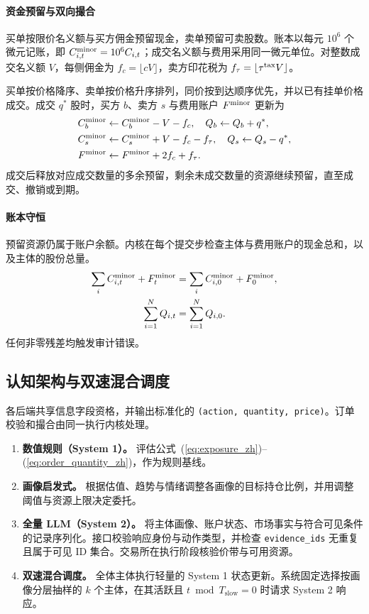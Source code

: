 \paragraph{资金预留与双向撮合} 买单按限价名义额与买方佣金预留现金，卖单预留可卖股数。账本以每元 $10^6$ 个微元记账，即 $C_{i,t}^{\rm minor}=10^6 C_{i,t}$；成交名义额与费用采用同一微元单位。对整数成交名义额 $V$，每侧佣金为 $f_c=\lfloor cV\rfloor$，卖方印花税为 $f_\tau=\lfloor\tau^{\rm tax}V\rfloor$。

买单按价格降序、卖单按价格升序排列，同价按到达顺序优先，并以已有挂单价格成交。成交 $q^*$ 股时，买方 $b$、卖方 $s$ 与费用账户 $F^{\rm minor}$ 更新为
\begin{align}
  C_b^{\rm minor} &\gets C_b^{\rm minor} - V-f_c, \quad Q_b \gets Q_b + q^*, \label{eq:settle_b_zh} \\
  C_s^{\rm minor} &\gets C_s^{\rm minor} + V-f_c-f_\tau, \quad Q_s \gets Q_s - q^*, \label{eq:settle_s_zh} \\
  F^{\rm minor} &\gets F^{\rm minor} +2f_c+f_\tau. \label{eq:settle_fees_zh}
\end{align}
成交后释放对应成交数量的多余预留，剩余未成交数量的资源继续预留，直至成交、撤销或到期。

\paragraph{账本守恒} 预留资源仍属于账户余额。内核在每个提交步检查主体与费用账户的现金总和，以及主体的股份总量。
\begin{equation}
\begin{aligned}
 \sum_i C_{i,t}^{\rm minor}+F_t^{\rm minor}&=\sum_i C_{i,0}^{\rm minor}+F_0^{\rm minor},\\
 \sum_{i=1}^N Q_{i,t}&=\sum_{i=1}^N Q_{i,0}.
\end{aligned}
  \label{eq:invariants_zh}
\end{equation}
任何非零残差均触发审计错误。

\subsection{认知架构与双速混合调度}
\label{sec:method:cognition_zh}

各后端共享信息字段资格，并输出标准化的 \texttt{(action, quantity, price)}。订单校验和撮合由同一执行内核处理。
\begin{enumerate}[leftmargin=*, label=(\arabic*)]
  \item \textbf{数值规则（System 1）。} 评估公式~(\ref{eq:exposure_zh})--(\ref{eq:order_quantity_zh})，作为规则基线。
  \item \textbf{画像启发式。} 根据估值、趋势与情绪调整各画像的目标持仓比例，并用调整阈值与资源上限决定委托。
  \item \textbf{全量 LLM（System 2）。} 将主体画像、账户状态、市场事实与符合可见条件的记录序列化。接口校验响应身份与动作类型，并检查 \texttt{evidence\_ids} 无重复且属于可见 ID 集合。交易所在执行阶段核验价带与可用资源。
  \item \textbf{双速混合调度。} 全体主体执行轻量的 System 1 状态更新。系统固定选择按画像分层抽样的 $k$ 个主体，在其活跃且 $t\bmod T_{\mathrm{slow}}=0$ 时请求 System 2 响应。
\end{enumerate}

